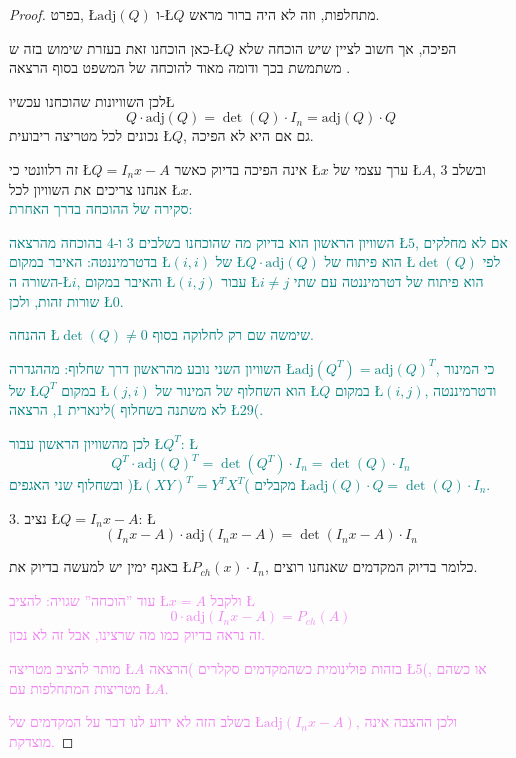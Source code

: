\documentclass[english,hebrew]{article}
\begin{document}
\begin{proof}
בפרט, \L{$\text{adj}(Q)$} ו-\L{$Q$} מתחלפות, וזה לא היה ברור מראש.

כאן הוכחנו זאת בעזרת שימוש בזה ש-\L{$Q$} הפיכה, אך חשוב לציין שיש
הוכחה שלא משתמשת בכך ודומה מאוד להוכחה של המשפט בסוף הרצאה {\endL}.

לכן השוויונות שהוכחנו עכשיו\L{%
\[
Q\cdot\text{adj}(Q)=\det(Q)\cdot I_{n}=\text{adj}(Q)\cdot Q
\]
}%
נכונים לכל מטריצה ריבועית \L{$Q$}, גם אם היא לא הפיכה.

זה רלוונטי כי \L{$Q=I_{n}x-A$} אינה הפיכה בדיוק כאשר \L{$x$} ערך
עצמי של \L{$A$}, ובשלב 3 אנחנו צריכים את השוויון לכל \L{$x$}.\\

\textcolor{teal}{סקירה של ההוכחה בדרך האחרת: }

\textcolor{teal}{השוויון הראשון הוא בדיוק מה שהוכחנו בשלבים 3 ו-4
בהוכחה מהרצאה \L{$5$}, אם לא מחלקים בדטרמיננטה: האיבר במקום \L{$(i,i)$}
של \L{$Q\cdot\text{adj}(Q)$} הוא פיתוח של \L{$\det(Q)$} לפי השורה
ה-\L{$i$}, והאיבר במקום \L{$(i,j)$} עבור \L{$i\neq j$} הוא פיתוח
של דטרמיננטה עם שתי שורות זהות, ולכן \L{$0$}.}

\textcolor{teal}{ההנחה \L{$\det(Q)\neq0$} שימשה שם רק לחלוקה בסוף.}

\textcolor{teal}{השוויון השני נובע מהראשון דרך שחלוף: מההגדרה \L{$\text{adj}(Q^{T})=\text{adj}(Q)^{T}$},
כי המינור של \L{$Q^{T}$} במקום \L{$(j,i)$} הוא השחלוף של המינור
של \L{$Q$} במקום \L{$(i,j)$}, ודטרמיננטה לא משתנה בשחלוף )לינארית
1, הרצאה \L{$29$}(.}

\textcolor{teal}{לכן מהשוויון הראשון עבור \L{$Q^{T}$}: \L{%
\[
Q^{T}\cdot\text{adj}(Q)^{T}=\det(Q^{T})\cdot I_{n}=\det(Q)\cdot I_{n}
\]
}%
ובשחלוף שני האגפים )\L{$(XY)^{T}=Y^{T}X^{T}$}( מקבלים \L{$\text{adj}(Q)\cdot Q=\det(Q)\cdot I_{n}$}.}

3. נציב \L{$Q=I_{n}x-A$}: \L{%
\[
(I_{n}x-A)\cdot\text{adj}(I_{n}x-A)=\det(I_{n}x-A)\cdot I_{n}
\]
}%

באגף ימין יש למעשה בדיוק את \L{$P_{ch}(x)\cdot I_{n}$}, כלומר בדיוק
המקדמים שאנחנו רוצים.

\textcolor{violet}{עוד \textquotedblright הוכחה\textquotedblright{}
שגויה: להציב \L{$x=A$} ולקבל \L{%
\[
0\cdot\text{adj}(I_{n}x-A)=P_{ch}(A)
\]
}%
זה נראה בדיוק כמו מה שרצינו, אבל זה לא נכון.}

\textcolor{violet}{מותר להציב מטריצה \L{$A$} בזהות פולינומית כשהמקדמים
סקלרים )הרצאה \L{$5$}(, או כשהם מטריצות המתחלפות עם \L{$A$}.}

\textcolor{violet}{בשלב הזה לא ידוע לנו דבר על המקדמים של \L{$\text{adj}(I_{n}x-A)$},
ולכן ההצבה אינה מוצדקת.}


\end{proof}
\end{document}
